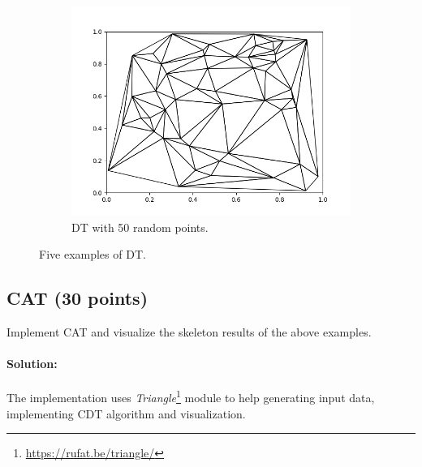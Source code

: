 \documentclass[]{article}
\begin{document}
\begin{figure}[ht]
\begin{subfigure}{0.30\textwidth}
        \centering
        \includegraphics[width=\linewidth]{50p.png}
        \caption{DT with 50 random points.}
        \label{fig:50}
    \end{subfigure}
    
    \caption{
        Five examples of DT.
    }
    \label{fig:q1}
\end{figure}




\newpage
\newpage
\subsection{CAT (30 points)}
Implement CAT and visualize the skeleton results of the above examples. 

\paragraph{\color{red}Solution:}

The implementation uses \textit{Triangle}\footnote[3]{\url{https://rufat.be/triangle/}} module to help generating input data, implementing CDT algorithm and visualization.
\end{document}
